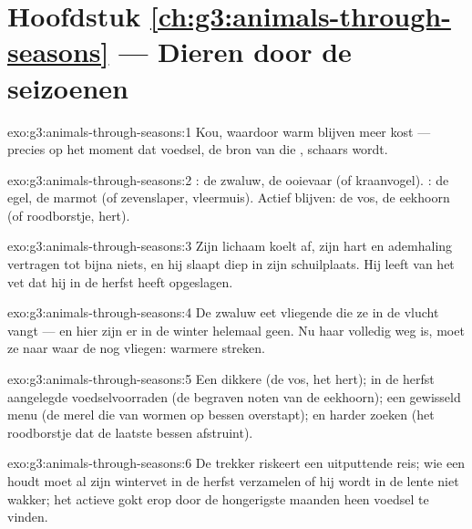 \section*{Hoofdstuk \ref{ch:g3:animals-through-seasons} --- Dieren door de seizoenen}

\begin{solution}{exo:g3:animals-through-seasons:1}
Kou, waardoor warm blijven meer  kost --- precies op het moment
dat voedsel, de bron van die , schaars wordt.
\end{solution}

\begin{solution}{exo:g3:animals-through-seasons:2}
: de zwaluw, de ooievaar (of kraanvogel). : de egel,
de marmot (of zevenslaper, vleermuis). Actief blijven: de vos, de
eekhoorn (of roodborstje, hert).
\end{solution}

\begin{solution}{exo:g3:animals-through-seasons:3}
Zijn lichaam koelt af, zijn hart en ademhaling vertragen tot bijna
niets, en hij slaapt diep in zijn schuilplaats. Hij leeft van het vet
dat hij in de herfst heeft opgeslagen.
\end{solution}

\begin{solution}{exo:g3:animals-through-seasons:4}
De zwaluw eet vliegende  die ze in de vlucht vangt --- en hier
zijn er in de winter helemaal geen. Nu haar  volledig
weg is, moet ze naar waar de  nog vliegen: warmere streken.
\end{solution}

\begin{solution}{exo:g3:animals-through-seasons:5}
Een dikkere  (de vos, het hert); in de herfst aangelegde
voedselvoorraden (de begraven noten van de eekhoorn); een gewisseld
menu (de merel die van wormen op bessen overstapt); en harder zoeken
(het roodborstje dat de laatste bessen afstruint).
\end{solution}

\begin{solution}{exo:g3:animals-through-seasons:6}
De trekker riskeert een uitputtende reis; wie een  houdt
moet al zijn wintervet in de herfst verzamelen of hij wordt in de lente
niet wakker; het actieve  gokt erop door de hongerigste maanden
heen voedsel te vinden.
\end{solution}

